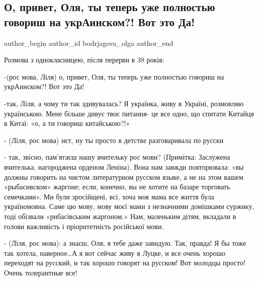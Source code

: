 
 
 
 
 
 
\subsection{О, привет, Оля, ты теперь уже полностью говориш на укрАинском?! Вот это Да!}
\label{sec:21_09_2021.fb.bodrjagova_olga.1.jazyk_mova_odnoklassnica}
 
\ifcmt
 author_begin
   author_id bodrjagova_olga
 author_end
\fi

Розмова з однокласницею, після перерви в 38 років:

-(рос мова, Ліля) о, привет, Оля, ты теперь уже полностью говориш на
укрАинском?! Вот это Да!

-так, Ліля, а чому ти так здивувалась? Я українка, живу в Україні, розмовляю
українською. Мене більше дивує твоє питання- це все одно, що спитати Китайця в
Китаї: «о, а ти говориш китайською?!»

- (Ліля, рос мова) нєт, ну ты просто в детстве разговаривала по русски

- так, звісно, пам’ятаєш нашу вчительку рос мови? (Примітка: Заслужена
вчителька, нагороджена орденом Леніна). Вона нам завжди повторювала: «вы должны
говорить на чистом литературном русском языке, а не на этом вашем «рыбасивском»
жаргоне; если, конечно, вы не хотите на базаре торговать семечками». Ми були
зросійщені, всі, хоча моя мама все життя була україномовна. Саме цю мову, мову
моєї мами з незначними домішками суржику, тоді обізвали «рибасівським
жаргоном.» Нам, маленьким дітям, вкладали в голови важливість і пріоритетність
російської мови.

- (Ліля, рос мова): а знаєш, Оля, я тебе даже завидую. Так, правда! Я бы тоже
так хотела, наверное…А я вот сейчас живу в Луцке, и все очень хорошо переходят
на русский, и так хорошо говорят на русском! Вот молодцы просто! Очень
толерантные все!

